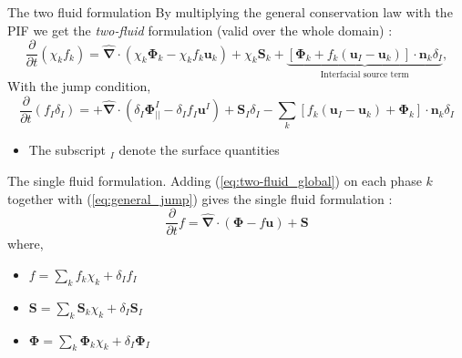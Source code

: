 \documentclass{sintefbeamer}
\newcommand{\nablabh}{\hat{\bm{\nabla}}}
\newcommand{\pddt}{\frac{\partial}{\partial t}}
\begin{document}
\begin{frame}
  {The two fluid formulation}
  By multiplying the general conservation law with the PIF we get the \textit{two-fluid} formulation (valid over the whole domain) :
  \begin{equation}
    \pddt (\chi_k f_k)
    = \nablabh \cdot (\chi_k \bm{\Phi}_k - \chi_k f_k \textbf{u}_k)
    + \chi_k \textbf{S}_k
    + \underbrace{
    \left[
        \bm{\Phi}_k 
        + f_k 
        \left(
            \textbf{u}_I
            - \textbf{u}_k
        \right) 
    \right]
    \cdot \textbf{n}_k \delta_I }_{\text{Interfacial source term}},
    \label{eq:two-fluid_global}
\end{equation}
With the jump condition, 
\begin{equation}
  \pddt (f_I\delta_I)  
  = 
  + \nablabh \cdot (\delta_I \mathbf{\Phi}^I_{||} - \delta_I f_I \textbf{u}^I)
  +\textbf{S}_I \delta_I
  - \sum_k \left[
  f_k (\textbf{u}_I - \textbf{u}_k)
  + \mathbf{\Phi}_k
  \right] \cdot \textbf{n}_k \delta_I
  \label{eq:general_jump}
\end{equation}
\begin{itemize}
  \item The subscript $_I$ denote the surface quantities
\end{itemize}
\end{frame}

\begin{frame}{The single fluid formulation.}
  Adding (\ref{eq:two-fluid_global}) on each phase $k$ together with (\ref{eq:general_jump}) gives the single fluid formulation :
  \begin{equation}
    \pddt f
    = \nablabh \cdot (\bm{\Phi} - f \textbf{u})
    + \textbf{S}
    \label{eq:one-fluid_global}
\end{equation}
where,
\begin{itemize}
  \item $f = \sum_k f_k \chi_k + \delta_I f_I$ 
  \item $\textbf{S} = \sum_k \textbf{S}_k \chi_k + \delta_I \textbf{S}_I$
  \item $\bm{\Phi} = \sum_k \bm{\Phi}_k \chi_k+ \delta_I \mathbf{\Phi}_I$
\end{itemize}
\end{frame}
\end{document}
